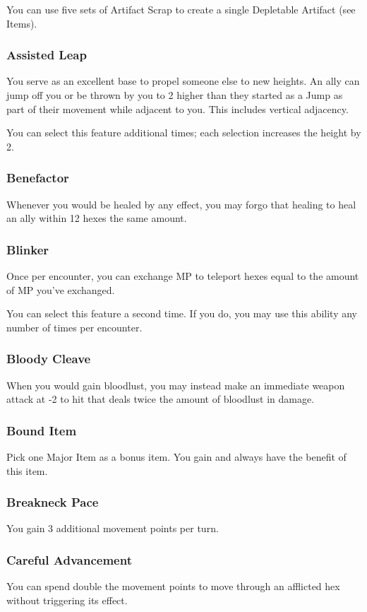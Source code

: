 \begin{multicols*}{2}
You can use five sets of Artifact Scrap to create a single Depletable Artifact (see Items).

\subsubsection{Assisted Leap}
You serve as an excellent base to propel someone else to new heights. An ally can jump off you or be thrown by you to 2 higher than they started as a Jump as part of their movement while adjacent to you. This includes vertical adjacency.

You can select this feature additional times; each selection increases the height by 2.

\subsubsection{Benefactor}
Whenever you would be healed by any effect, you may forgo that healing to heal an ally within 12 hexes the same amount.

\subsubsection{Blinker}
Once per encounter, you can exchange MP to teleport hexes equal to the amount of MP you’ve exchanged.

You can select this feature a second time. If you do, you may use this ability any number of times per encounter.

\subsubsection{Bloody Cleave}
When you would gain bloodlust, you may instead make an immediate weapon attack at -2 to hit that deals twice the amount of bloodlust in damage.

\subsubsection{Bound Item}
Pick one Major Item as a bonus item. You gain and always have the benefit of this item.

\subsubsection{Breakneck Pace}
You gain 3 additional movement points per turn.

\subsubsection{Careful Advancement}
You can spend double the movement points to move through an afflicted hex without triggering its effect.


\end{multicols*}

